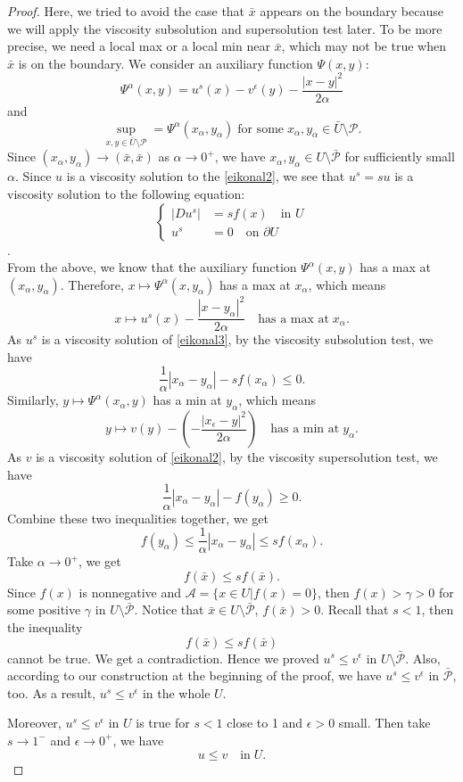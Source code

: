 \documentclass[12pt,reqno]{amsart}
\numberwithin{figure}{section}
\theoremstyle{plain}
\numberwithin{equation}{section}
\begin{document}
\begin{proof}
Here, we tried to avoid the case that $\bar x$ appears on the boundary because we will apply the viscosity subsolution and supersolution test later.
To be more precise, we need a local max or a local min near $\bar x$, which may not be true when $\bar x$ is on the boundary.
We consider an auxiliary function $\Psi(x,y) $:
\[
    \Psi^{\alpha}(x,y)=u^{s}(x)-v^{\epsilon}(y)-\frac{|x-y|^2}{2\alpha}
\]
and
\[
    \sup_{x,y\in \bar{U}\setminus\mathcal{P}}=\Psi ^{\alpha}(x_\alpha,y_\alpha) \; \text{for some} \; x_\alpha,y_\alpha \in \bar{U}\setminus\mathcal{P}.
\]
Since $(x_\alpha, y_\alpha) \rightarrow (\bar{x}, \bar{x})$ as $\alpha \rightarrow 0^+$, we have $x_\alpha, y_\alpha \in U \setminus \bar{\mathcal{P}}$ for sufficiently small $\alpha$.
Since $u$ is a viscosity solution to the \eqref{eikonal2}, we see that $u^s = su$ is a viscosity solution to the following equation:\\
\begin{equation}\label{eikonal3}
\left\{
\begin{aligned}
|Du^s| &= sf(x) \quad \text{in } U \\
u^s &= 0 \quad \text{on } \partial U
\end{aligned} 
\right.    
\end{equation}.\\
From the above, we know that the auxiliary function $\Psi^{\alpha}(x,y)$ has a max at $(x_\alpha,y_\alpha)$. Therefore, $x\mapsto \Psi^\alpha(x,y_\alpha)$ has a max at $x_\alpha$, which means
\[
    x\mapsto u^s (x)-\frac{|x-y_\alpha|^2}{2\alpha} \quad \text{has a max at} \; x_\alpha.
\]
As $u^s$ is a viscosity solution of \eqref{eikonal3}, by the viscosity subsolution test, we have 
\[
    \frac{1}{\alpha}|x_\alpha-y_\alpha|-sf(x_\alpha)\le0.
\]
Similarly, $y\mapsto \Psi^\alpha (x_\alpha,y)$ has a min at $y_\alpha$, which means 
\[
    y\mapsto v(y)-(-\frac{|x_\epsilon-y|^2}{2\alpha})\quad \text{has a min at} \; y_\alpha.
\]
As $v$ is a viscosity solution of \eqref{eikonal2}, by the viscosity supersolution test, we have 
\[
    \frac{1}{\alpha}|x_\alpha-y_\alpha|-f(y_\alpha)\ge0.
\]
Combine these two inequalities together, we get 
\[
    f(y_\alpha)\le \frac{1}{\alpha}|x_\alpha - y_\alpha|\le sf(x_\alpha).
\]
Take $\alpha \rightarrow 0^+$, we get 
\[
    f(\bar{x})\le sf(\bar{x}).
\]
Since $f(x)$ is nonnegative and  $\mathcal{A}=\{x\in U|f(x)=0\}$, then $f(x)>\gamma>0$ for some positive $\gamma$ in $U\setminus \bar{\mathcal{P}}$. Notice that  $\bar{x}\in U\setminus \bar{\mathcal{P}}$, $f(\bar{x})>0$. Recall that $s<1$, then the inequality 
\[
    f(\bar{x})\le sf(\bar{x})
\]
cannot be true. We get a contradiction. Hence we proved $u^s\le v^{\epsilon}$ in $U\setminus{\bar{\mathcal{P}}}$. 
Also, according to our construction at the beginning of the proof, we have $u^s\le v^\epsilon$ in $\mathcal{\bar{P}}$, too. As a result, $u^s\le v^\epsilon$ in the whole $U$. 

Moreover, $u^s\le v^\epsilon$ in $U$ is true for $s<1$ close to 1 and $\epsilon>0$ small. Then take $s\rightarrow 1^-$ and $\epsilon \rightarrow 0^+$, we have
\[
    u\le v \quad \text{in}\; U.
\]
\end{proof}
\end{document}
